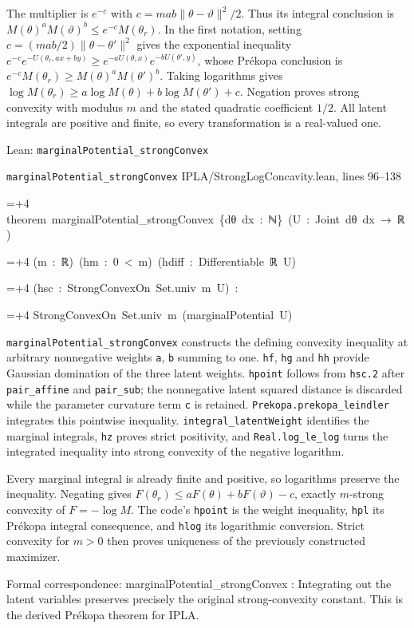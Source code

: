\documentclass[11pt,a4paper]{report}
\newlength{\leancharwidth}
\newenvironment{leancode}{\par\smallskip\begingroup\ttfamily\footnotesize\raggedright
  \settowidth{\leancharwidth}{M}\setlength{\parskip}{0pt}\setlength{\parindent}{0pt}
  \frenchspacing}{\par\endgroup\smallskip}
\newcommand{\leanline}[2]{\hangindent=\dimexpr#1\leancharwidth+4\leancharwidth\relax
  \hangafter=1\noindent\hspace*{#1\leancharwidth}#2\par}
\newcommand{\leansource}[1]{\par{\footnotesize\color{leanmuted}#1}\par}
\newcommand{\leanlabel}[1]{\par\smallskip\noindent{\small\bfseries #1}\par}
\begin{document}
The multiplier is \(e^{-c}\) with \(c=mab\|\theta-\vartheta\|^2/2\). Thus its integral conclusion is \(M(\theta)^aM(\vartheta)^b\le e^{-c}M(\theta_r)\). In the first notation, setting \(c=(mab/2)\|\theta-\theta'\|^2\) gives the exponential inequality \(e^{-c}e^{-U(\theta_r,ax+by)}\ge e^{-aU(\theta,x)}e^{-bU(\theta',y)}\), whose Prékopa conclusion is \(e^{-c}M(\theta_r)\ge M(\theta)^aM(\theta')^b\). Taking logarithms gives \(\log M(\theta_r)\ge a\log M(\theta)+b\log M(\theta')+c\). Negation proves strong convexity with modulus \(m\) and the stated quadratic coefficient \(1/2\). All latent integrals are positive and finite, so every transformation is a real-valued one.

\begin{leanbox}{Lean: \texttt{marginalPotential\_\allowbreak{}strongConvex}}
\leansource{\texttt{marginalPotential\_\allowbreak{}strongConvex} \quad IPLA/\allowbreak{}StrongLogConcavity.lean, lines 96–138}
\begin{leancode}
\leanline{0}{theorem\ marginalPotential\_strongConvex\ \{dθ\ dx\ :\ ℕ\}\ (U\ :\ Joint\ dθ\ dx\ →\ ℝ)}
\leanline{4}{(m\ :\ ℝ)\ (hm\ :\ 0\ <\ m)\ (hdiff\ :\ Differentiable\ ℝ\ U)}
\leanline{4}{(hsc\ :\ StrongConvexOn\ Set.univ\ m\ U)\ :}
\leanline{4}{StrongConvexOn\ Set.univ\ m\ (marginalPotential\ U)}
\end{leancode}
\leanlabel{How the Lean proof follows the argument}
\texttt{marginal\allowbreak{}Potential\_\allowbreak{}strong\allowbreak{}Convex} constructs the defining convexity inequality at arbitrary nonnegative weights \texttt{a}, \texttt{b} summing to one. \texttt{hf}, \texttt{hg} and \texttt{hh} provide Gaussian domination of the three latent weights. \texttt{hpoint} follows from \texttt{hsc.\allowbreak{}2} after \texttt{pair\_\allowbreak{}affine} and \texttt{pair\_\allowbreak{}sub}; the nonnegative latent squared distance is discarded while the parameter curvature term \texttt{c} is retained. \texttt{Prekopa.\allowbreak{}prekopa\_\allowbreak{}leindler} integrates this pointwise inequality. \texttt{integral\_\allowbreak{}latent\allowbreak{}Weight} identifies the marginal integrals, \texttt{hz} proves strict positivity, and \texttt{Real.\allowbreak{}log\_\allowbreak{}le\_\allowbreak{}log} turns the integrated inequality into strong convexity of the negative logarithm.



Every marginal integral is already finite and positive, so logarithms preserve the inequality. Negating gives \(F(\theta_r)\le aF(\theta)+bF(\vartheta)-c\), exactly \(m\)-strong convexity of \(F=-\log M\). The code's \texttt{hpoint} is the weight inequality, \texttt{hpl} its Prékopa integral consequence, and \texttt{hlog} its logarithmic conversion. Strict convexity for \(m>0\) then proves uniqueness of the previously constructed maximizer.



Formal correspondence: marginalPotential\_strongConvex : Integrating out the latent variables preserves precisely the original strong-convexity constant. This is the derived Prékopa theorem for IPLA.
\end{leanbox}
\end{document}

